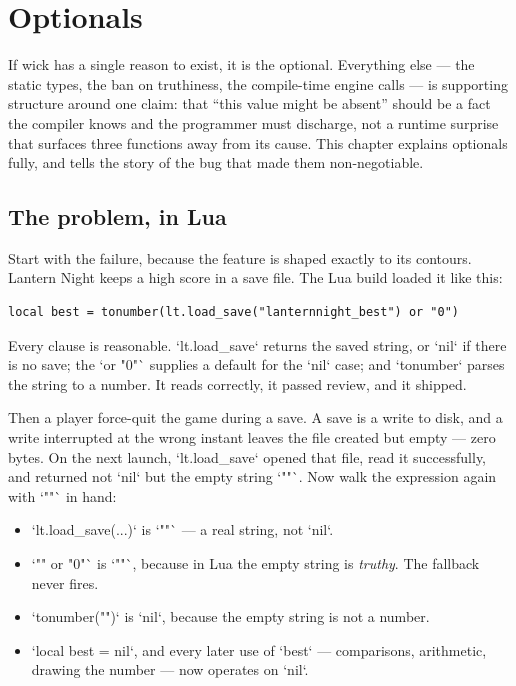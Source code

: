 \chapter{Optionals}

If wick has a single reason to exist, it is the optional. Everything else ---
the static types, the ban on truthiness, the compile-time engine calls --- is
supporting structure around one claim: that ``this value might be absent''
should be a fact the compiler knows and the programmer must discharge, not a
runtime surprise that surfaces three functions away from its cause. This
chapter explains optionals fully, and tells the story of the bug that made
them non-negotiable.

\section{The problem, in Lua}

Start with the failure, because the feature is shaped exactly to its
contours. Lantern Night keeps a high score in a save file. The Lua build loaded
it like this:

\begin{lstlisting}[language=luatwin]
local best = tonumber(lt.load_save("lanternnight_best") or "0")
\end{lstlisting}

\noindent
Every clause is reasonable. `lt.load_save` returns the saved string, or `nil`
if there is no save; the `or "0"` supplies a default for the `nil` case; and
`tonumber` parses the string to a number. It reads correctly, it passed
review, and it shipped.

Then a player force-quit the game during a save. A save is a write to disk,
and a write interrupted at the wrong instant leaves the file created but
empty --- zero bytes. On the next launch, `lt.load_save` opened that file,
read it successfully, and returned not `nil` but the empty string `""`. Now
walk the expression again with `""` in hand:

\begin{itemize}
\item `lt.load_save(...)` is `""` --- a real string, not `nil`.
\item `"" or "0"` is `""`, because in Lua the empty string is
\emph{truthy}. The fallback never fires.
\item `tonumber("")` is `nil`, because the empty string is not a number.
\item `local best = nil`, and every later use of `best` --- comparisons,
arithmetic, drawing the number --- now operates on `nil`.
\end{itemize}

